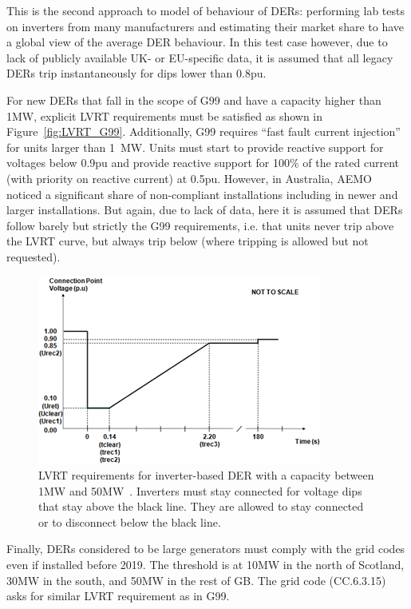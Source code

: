 This is the second approach to model of behaviour of DERs: performing lab tests on inverters from many manufacturers and estimating their market share to have a global view of the average DER behaviour. In this test case however, due to lack of publicly available UK- or EU-specific data, it is assumed that all legacy DERs trip instantaneously for dips lower than 0.8pu.

For new DERs that fall in the scope of G99 and have a capacity higher than 1MW, explicit LVRT requirements must be satisfied as shown in Figure~\ref{fig:LVRT_G99}. Additionally, G99 requires ``fast fault current injection'' for units larger than 1~MW. Units must start to provide reactive support for voltages below 0.9pu and provide reactive support for 100\% of the rated current (with priority on reactive current) at 0.5pu. However, in Australia, AEMO noticed a significant share of non-compliant installations including in newer and larger installations. But again, due to lack of data, here it is assumed that DERs follow barely but strictly the G99 requirements, i.e. that units never trip above the LVRT curve, but always trip below (where tripping is allowed but not requested).

\begin{figure}
    \centering
    \includegraphics[width=0.7\linewidth]{Figs/G99_LVRT.png}
    \caption{LVRT requirements for inverter-based DER with a capacity between 1MW and 50MW~\cite{G99}. Inverters must stay connected for voltage dips that stay above the black line. They are allowed to stay connected or to disconnect below the black line.}
    \label{fig:G99_LVRT}
\end{figure}

Finally, DERs considered to be large generators must comply with the grid codes even if installed before 2019. The threshold is at 10MW in the north of Scotland, 30MW in the south, and 50MW in the rest of GB. The grid code (CC.6.3.15) asks for similar LVRT requirement as in G99.

